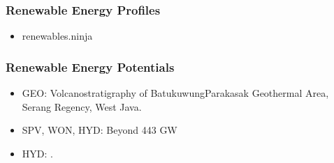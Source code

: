 \documentclass[a4paper,11pt,english]{sphinxmanual}
\begin{document}
\subsubsection{Renewable Energy Profiles}
\label{\detokenize{1_indonesia:renewable-energy-profiles}}\begin{itemize}
\item {} 
\sphinxAtStartPar
renewables.ninja

\end{itemize}


\subsubsection{Renewable Energy Potentials}
\label{\detokenize{1_indonesia:renewable-energy-potentials}}\begin{itemize}
\item {} 
\sphinxAtStartPar
GEO: Volcanostratigraphy of Batukuwung\sphinxhyphen{}Parakasak Geothermal Area, Serang Regency, West Java.

\item {} 
\sphinxAtStartPar
SPV, WON, HYD: Beyond 443 GW

\item {} 
\sphinxAtStartPar
HYD: .

\end{itemize}
\end{document}

